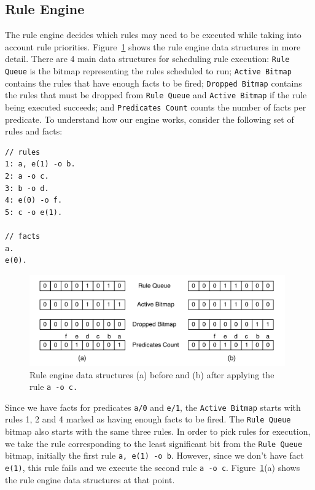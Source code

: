 \subsection{Rule Engine}
\label{rule_engine}

The rule engine decides which rules may need to be executed while
taking into account rule priorities. Figure~\ref{fig:rule_engine}
shows the rule engine data structures in more detail. There are 4 main
data structures for scheduling rule execution: \texttt{Rule Queue} is
the bitmap representing the rules scheduled to run; \texttt{Active
Bitmap} contains the rules that have enough facts to be
fired; \texttt{Dropped Bitmap} contains the rules that must be dropped
from \texttt{Rule Queue} and \texttt{Active Bitmap} if the rule being
executed succeeds; and \texttt{Predicates Count} counts the number of
facts per predicate. To understand how our engine works, consider the
following set of rules and facts:

{\footnotesize
\begin{Verbatim}
// rules
1: a, e(1) -o b.
2: a -o c.
3: b -o d.
4: e(0) -o f.
5: c -o e(1).

// facts
a.
e(0).
\end{Verbatim}
}

\begin{figure}[t]
\centering
\includegraphics[width=11cm]{figures/rule_queue.pdf}
\caption{Rule engine data structures (a) before and (b) after applying 
  the rule \texttt{a -o c.}}
\label{fig:rule_engine}
\end{figure}

Since we have facts for predicates \texttt{a/0} and \texttt{e/1},
the \texttt{Active Bitmap} starts with rules 1, 2 and 4 marked as
having enough facts to be fired. The \texttt{Rule Queue} bitmap also
starts with the same three rules. In order to pick rules for
execution, we take the rule corresponding to the least significant bit
from the \texttt{Rule Queue} bitmap, initially the first
rule \texttt{a, e(1) -o b}. However, since we don't have
fact \texttt{e(1)}, this rule fails and we execute the second
rule \texttt{a -o c}. Figure~\ref{fig:rule_engine}(a) shows the rule
engine data structures at that point.


